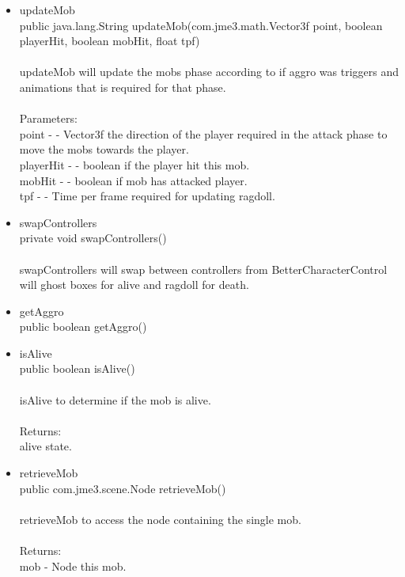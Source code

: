 \documentclass[letterpaper]{article}
\begin{document}
\begin{itemize}
\begin{itemize}
									\item	updateMob \\
											public java.lang.String updateMob(com.jme3.math.Vector3f point,
											                         boolean playerHit,
											                         boolean mobHit,
											                         float tpf) \\ \\
											updateMob will update the mobs phase according to if aggro was triggers and animations that is required for that phase. \\ \\
											Parameters: \\
											point - - Vector3f the direction of the player required in the attack phase to move the mobs towards the player. \\
											playerHit - - boolean if the player hit this mob. \\
											mobHit - - boolean if mob has attacked player. \\
											tpf - - Time per frame required for updating ragdoll. \\
									\item	swapControllers \\
											private void swapControllers() \\ \\
											swapControllers will swap between controllers from BetterCharacterControl will ghost boxes for alive and ragdoll for death. \\
									\item	getAggro \\
											public boolean getAggro() \\
									\item	isAlive \\
											public boolean isAlive() \\ \\
											isAlive to determine if the mob is alive. \\ \\
											Returns: \\
											alive state. \\
									\item	retrieveMob \\
											public com.jme3.scene.Node retrieveMob() \\ \\
											retrieveMob to access the node containing the single mob. \\ \\
											Returns: \\
											mob - Node this mob.
								\end{itemize}
					\end{itemize}
					
\end{document}
